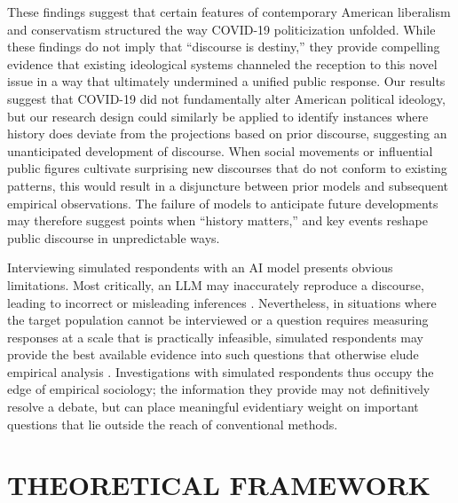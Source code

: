 \documentclass{article} %
\begin{document}
These findings suggest that certain features of contemporary American
liberalism and conservatism structured the way COVID-19 politicization
unfolded. While these findings do not imply that ``discourse is
destiny,'' they provide compelling evidence that existing ideological
systems channeled the reception to this novel issue in a way that
ultimately undermined a unified public response. Our results suggest
that COVID-19 did not fundamentally alter American political ideology,
but our research design could similarly be applied to identify instances
where history does deviate from the projections based on prior
discourse, suggesting an unanticipated development of discourse. When
social movements or influential public figures cultivate surprising new
discourses that do not conform to existing patterns, this would result
in a disjuncture between prior models and subsequent empirical
observations. The failure of models to anticipate future developments
may therefore suggest points when ``history matters,'' and key events
reshape public discourse in unpredictable ways.

Interviewing simulated respondents with an AI model presents obvious
limitations. Most critically, an LLM may inaccurately reproduce a
discourse, leading to incorrect or misleading inferences
\parencite{Ji2023-ut}.
Nevertheless, in situations where the target population cannot be
interviewed or a question requires measuring responses at a scale that
is practically infeasible, simulated respondents may provide the best
available evidence into such questions that otherwise elude empirical
analysis \parencite{Kim2023-ji, Kozlowski2019-vh}. Investigations with simulated
respondents thus occupy the edge of empirical sociology; the information
they provide may not definitively resolve a debate, but can place
meaningful evidentiary weight on important questions that lie outside
the reach of conventional methods.

\section*{THEORETICAL FRAMEWORK}
\end{document}
